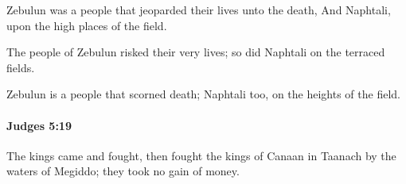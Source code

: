 			\begin{versebox}
					\item[BHS] 
					\item[ASV] Zebulun was a people that jeoparded their lives unto the death, And Naphtali, upon the high places of the field.
					\item[NIV] The people of Zebulun risked their very lives; so did Naphtali on the terraced fields.
					\item[NRSV] Zebulun is a people that scorned death; Naphtali too, on the heights of the field.
			\end{versebox}

		\paragraph{Judges 5:19} %
			\label{JUDGES-5-19}

			The kings came and fought, then fought the kings of Canaan in Taanach by the waters of Megiddo; they took no gain of money.

